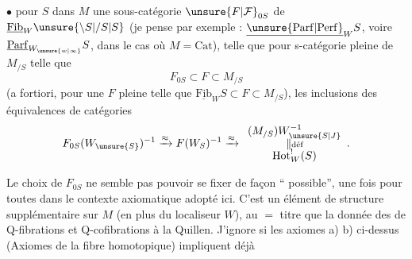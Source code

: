 $\bullet$ pour  $S$ dans $M$ une sous-catégorie $\unsure{F|\mathcal F}_{0S}$ de $\underline{\mathrm{Fib}}_{W}\unsure{\backslash S|/S|S}$ (je pense par exemple : $\underline{\unsure{\mathrm{Parf}|\mathrm{Perf}}}_{W}S$, voire $\underline{\mathrm{Parf}}_{W_{\unsure{w|\infty}}}S$, dans le cas où $M=\mathrm{Cat}$), telle que pour  s-catégorie pleine  de $M_{/S}$ telle que
\[
F_{0S}\subset F\subset M_{/S}
\]
(a fortiori, pour une $F$ pleine telle que $\underline{\mathrm{Fib}}_{W}S\subset F\subset M_{/S}$), les inclusions   des équivalences de catégories
\[
F_{0S}(W_{\unsure{S}})^{-1}\xrightarrow{\approx}
F(W_S)^{-1}\xrightarrow{\approx}
\begin{array}{c}
(M_{/S})W_{\unsure{S|J}}^{-1}\\[-2pt]
\Vert\scriptstyle{\text{déf}}\\[-2pt]
\mathrm{Hot}^{!}_{W}(S)
\end{array}.
\]

Le choix de $F_{0S}$ ne semble pas pouvoir se fixer de façon `` possible'', une fois pour toutes dans le contexte axiomatique adopté ici. C'est un élément de structure supplémentaire sur $M$ (en plus du localiseur $W$), au $=$ titre que la donnée des  de Q-fibrations et Q-cofibrations à la Quillen. J'ignore si les axiomes a) b) ci-dessus (Axiomes de la fibre homotopique) impliquent déjà
